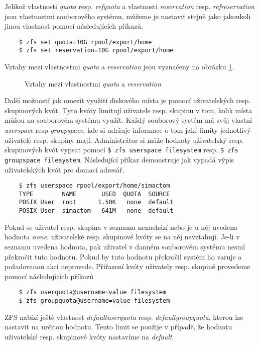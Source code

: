    Jelikož vlastnosti \emph{quota} resp. \emph{refquota} a vlastnosti \emph{reservation} resp. \emph{refreservation} jsou vlastnostmi souborového systému, můžeme je nastavit stejně jako jakoukoli jinou vlastnost pomocí následujících příkazů.
    \begin{verbatim}
    $ zfs set quota=10G rpool/export/home
    $ zfs set reservation=10G rpool/export/home
    \end{verbatim}

    Vztahy mezi vlastnostmi \emph{quota} a \emph{reservation} jsou vyznačeny na obrázku \ref{quotavsreserv}.
    \begin{figure}[h]
        \caption{Vztahy mezi vlastnostmi \emph{quota} a \emph{reservation}}
        \label{quotavsreserv}
    \end{figure}

    Další možností jak omezit využití diskového místa je pomocí uživatelských resp. skupinových kvót. Tyto kvóty limitují uživatele resp. skupinu v tom, kolik místa můžou na souborovém systému využít. Každý souborový systém má svůj vlastní \emph{userspace} resp \emph{groupspace}, kde si udržuje informace o tom jaké limity jednotlivý uživatelé resp. skupiny mají.
    Administrátor si může hodnoty uživatelský resp. skupinových kvót vypsat pomocí \verb|$ zfs userspace filesystem| resp. \verb|$ zfs groupspace filesystem|. Následující příkaz demonstruje jak vypadá výpis uživatelských kvót pro domací adresář.
    \begin{verbatim}
    $ zfs userspace rpool/export/home/simactom
    TYPE        NAME       USED  QUOTA  SOURCE
    POSIX User  root      1.50K   none  default
    POSIX User  simactom   641M   none  default
    \end{verbatim}

    Pokud se uživatel resp. skupina v seznamu nenachází nebo je u něj uvedena hodnota \emph{none}, uživatelské resp. skupinové kvóty se na něj nevztahují. Je-li v seznamu uvedena hodnota, pak uživatel v danném souborovém systému nesmí překročit tuto hodnotu. Pokud by tuto hodnotu překročil systém ho varuje a požadovanou akci neprovede. Přiřazení kvóty uživately resp. skupině provedeme pomocí následujících příkazů
    \begin{verbatim}
    $ zfs userquota@username=value filesystem
    $ zfs groupquota@username=value filesystem
    \end{verbatim}

    ZFS nabízí ještě vlastnost \emph{defaultuserquota} resp. \emph{defaultgroupquota}, kterou lze nastavit na určitou hodnotu. Tento limit se použije v případě, že hodnotu uživatelské resp. skupinové kvóty nastavíme na \emph{default}.
